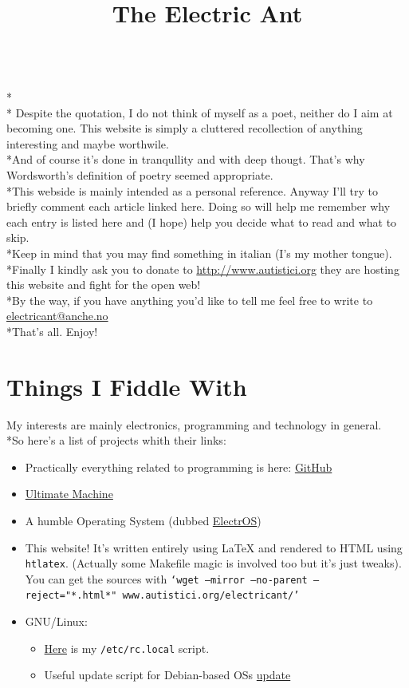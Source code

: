 \documentclass{article}
\title{The Electric Ant}
\date{}
\author{}
\begin{document}
\maketitle
{}
\\*\\*
Despite the quotation, I do not think of myself as a poet, neither do I aim at becoming one.
This website is simply a cluttered recollection of anything interesting and maybe worthwile.
\\*And of course it's done in tranqullity and with deep thougt. That's why Wordsworth's definition of poetry seemed appropriate.
\\*This webside is mainly intended as a personal reference. Anyway I'll try to briefly comment each article linked here. Doing so will help me remember why each entry is listed here and (I hope) help you decide what to read and what to skip.
\\*Keep in mind that you may find something in italian (I's my mother tongue).
\\*Finally I kindly ask you to donate to \url{http://www.autistici.org} they are hosting this website and fight for the open web!
\\*By the way, if you have anything you'd like to tell me feel free to write to \href{mailto:electricant@anche.no}{electricant@anche.no}
\\*That's all. Enjoy!

\tableofcontents
%
%
\section{Things I Fiddle With}
My interests are mainly electronics, programming and technology in general. 
\\*So here's a list of projects whith their links:
\begin{itemize}
      \item Practically everything related to programming is here:
                  \href{http://github.com/electricant}{GitHub}
      \item \href{ultimatema.html}{Ultimate Machine}
      \item A humble Operating System (dubbed \href{OS.html}{ElectrOS})
      \item This website! It's written entirely using \LaTeX{} and rendered to HTML using \texttt{htlatex}.
      (Actually some Makefile magic is involved too but it's just tweaks).
      You can get the sources with \texttt{`wget --mirror --no-parent --reject="*.html*" www.autistici.org/electricant/'}
      \item GNU/Linux:
      \begin{itemize}
            \item \href{other/rc.local}{Here} is my \texttt{/etc/rc.local} script.
            \item Useful update script for Debian-based OSs \href{other/update}{update}
      \end{itemize}
\end{itemize}
%
%
\end{document}

